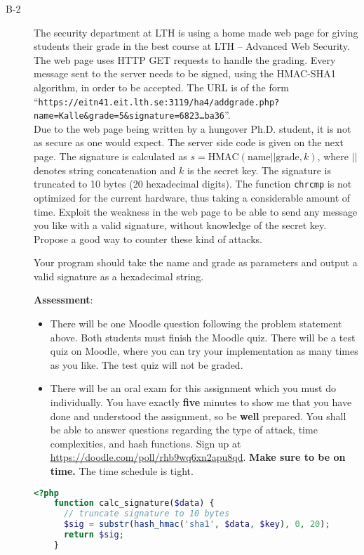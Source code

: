 \documentclass{article}
\begin{document}
\begin{description}
			
			\item[B-2]{The security department at LTH is using a home made web page for giving students their grade in the best course
				at LTH -- Advanced Web Security. The web page uses HTTP GET requests to handle the grading. Every message sent to the server
				needs to be signed, using the HMAC-SHA1 algorithm, in order to be accepted. The URL is of the form\\
				``\texttt{https://eitn41.eit.lth.se:3119/ha4/addgrade.php?name=Kalle\&grade=5\&signature=6823\ldots ba36}''.\\
				Due to the web page being written by a hungover Ph.D. student, it is not as secure as one would expect.
				The server side code is given on the next page.
				The signature is calculated as $s = \textrm{HMAC}(\textrm{name}||\textrm{grade}, k)$, where $||$ denotes 
				string concatenation and $k$ is the secret key. The signature is truncated to 10 bytes (20 hexadecimal digits).
				The function \texttt{chrcmp} is not optimized for the current hardware, 
				thus taking a considerable amount of time.
				Exploit the weakness in the web page to be able to send any message you like with a valid signature, 
				without knowledge of the secret key. Propose a good way to counter these kind of attacks.
				
				Your program should take the name and grade as parameters and output a valid signature as a hexadecimal string.
				
				\textbf{Assessment}:
				\begin{itemize}
					\item There will be one Moodle question following the problem statement above. Both students must finish the Moodle quiz.
					There will be a test quiz on Moodle, where you can try your implementation as many times as you like. The test quiz will not be graded.
					
					\item There will be an oral exam for this assignment which you must do individually. You have exactly \textbf{five} minutes to show me that you have done
					and understood the assignment, so be \textbf{well} prepared. 
					You shall be able to answer questions regarding the type of attack, time complexities, and hash functions.
					Sign up at \url{https://doodle.com/poll/rhb9wq6xn2apu8qd}. \textbf{Make sure to be on time.} The time schedule is tight.
				\end{itemize}
				
	\begin{lstlisting}[float=h, style=customc, language=php] 
	<?php
	function calc_signature($data) {
	  // truncate signature to 10 bytes
	  $sig = substr(hash_hmac('sha1', $data, $key), 0, 20);
	  return $sig;
	}
	

\end{lstlisting}}
\end{description}
\end{document}
